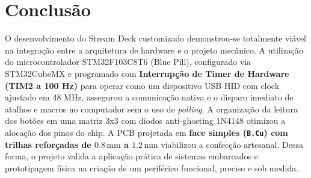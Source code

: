 \documentclass[12pt, a4paper]{article}
\begin{document}
\section{Conclusão}
\hspace*{1.25cm}O desenvolvimento do Stream Deck customizado demonstrou-se totalmente viável na integração entre a arquitetura de hardware e o projeto mecânico. A utilização do microcontrolador STM32F103C8T6 (Blue Pill), configurado via STM32CubeMX e programado com \textbf{Interrupção de Timer de Hardware (TIM2 a 100 Hz)} para operar como um dispositivo USB HID com clock ajustado em 48 MHz, assegurou a comunicação nativa e o disparo imediato de atalhos e macros no computador sem o uso de \textit{polling}. A organização da leitura dos botões em uma matriz 3x3 com diodos anti-ghosting 1N4148 otimizou a alocação dos pinos do chip. A PCB projetada em \textbf{face simples (\texttt{B.Cu}) com trilhas reforçadas de $0.8\,\text{mm}$ a $1.2\,\text{mm}$} viabilizou a confecção artesanal. Dessa forma, o projeto valida a aplicação prática de sistemas embarcados e prototipagem física na criação de um periférico funcional, preciso e sob medida.
\end{document}
